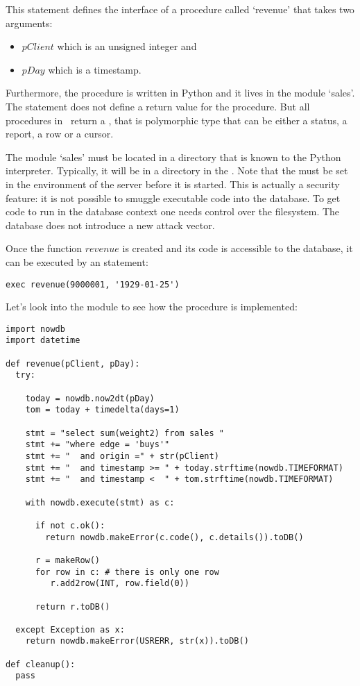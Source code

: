 This statement defines the interface of a procedure
called `revenue' that takes two arguments:
\begin{itemize}
\item $pClient$ which is an unsigned integer and
\item $pDay$ which is a timestamp.
\end{itemize}
Furthermore, the procedure is written in Python and
it lives in the module `sales'.
The statement does not define a return value for the procedure.
But all procedures in \nowdb\ return a ,
that is polymorphic type that
can be either a status, a report, a row or a cursor.

The module `sales' must be located in a directory that is
known to the Python interpreter. Typically, it will
be in a directory in the .
Note that the  must be set
in the environment of the server before it is started.
This is actually a security feature:
it is not possible to smuggle executable code
into the database. To get code to run in the database
context one needs control over the filesystem.
The database does not introduce a new attack vector.

Once the function $revenue$ is created
and its code is accessible to the database, it
can be executed by an  statement:

\begin{sqlcode}
\begin{lstlisting}
exec revenue(9000001, '1929-01-25')
\end{lstlisting}
\end{sqlcode}

\begin{minipage}{\textwidth}
Let's look into the module 
to see how the procedure is implemented:

\begin{python}
\begin{lstlisting}
import nowdb
import datetime

def revenue(pClient, pDay):
  try:

    today = nowdb.now2dt(pDay)
    tom = today + timedelta(days=1)

    stmt = "select sum(weight2) from sales "
    stmt += "where edge = 'buys'"
    stmt += "  and origin =" + str(pClient)
    stmt += "  and timestamp >= " + today.strftime(nowdb.TIMEFORMAT)
    stmt += "  and timestamp <  " + tom.strftime(nowdb.TIMEFORMAT)

    with nowdb.execute(stmt) as c:

      if not c.ok():
        return nowdb.makeError(c.code(), c.details()).toDB()

      r = makeRow()
      for row in c: # there is only one row
         r.add2row(INT, row.field(0))

      return r.toDB()

  except Exception as x:
    return nowdb.makeError(USRERR, str(x)).toDB()

def cleanup():
  pass

\end{lstlisting}
\end{python}
\end{minipage}


